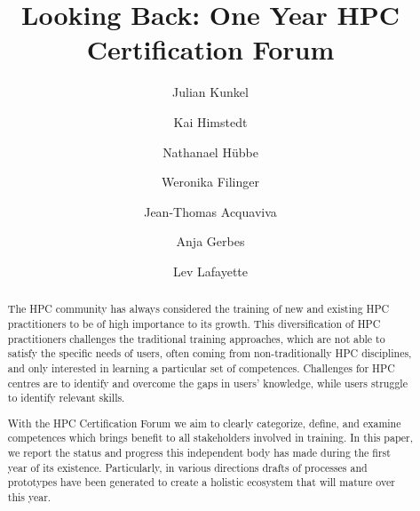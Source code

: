 \documentclass[jocse]{jocseart}
\begin{document}
\title{Looking Back: One Year HPC Certification Forum}

\author{Julian Kunkel}


\author{Kai Himstedt}
\author{Nathanael Hübbe}

\author{Weronika Filinger}

\author{Jean-Thomas Acquaviva}


\author{Anja Gerbes}

\author{Lev Lafayette}

\renewcommand{\shortauthors}{J. Kunkel et al.}


\begin{abstract}
  The HPC community has always considered the training of new and existing HPC practitioners to be of high importance to its growth.
  This diversification of HPC practitioners challenges the traditional training approaches, which are not able to satisfy the specific needs of users, often coming from non-traditionally HPC disciplines, and only interested in learning a particular set of competences.
  Challenges for HPC centres are to identify and overcome the gaps in users’ knowledge, while users struggle to identify relevant skills.

  With the HPC Certification Forum we aim to clearly categorize, define, and examine competences which brings benefit to all stakeholders involved in training.
  In this paper, we report the status and progress this independent body has made during the first year of its existence.
  Particularly, in various directions drafts of processes and prototypes have been generated to create a holistic ecosystem that will mature over this year.
\end{abstract}

%
%
\begin{CCSXML}
\end{CCSXML}
\end{document}
